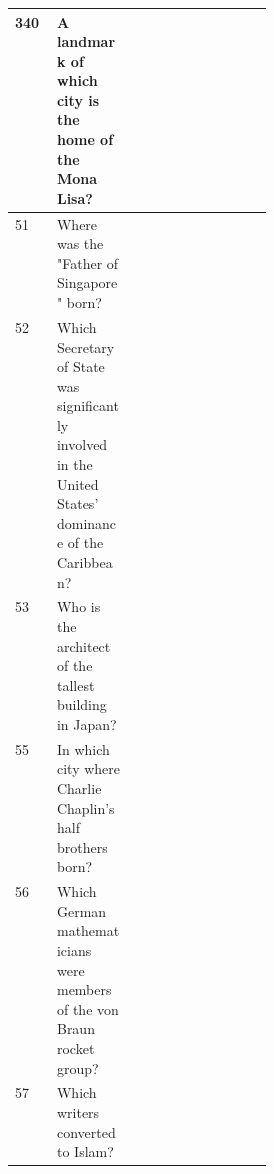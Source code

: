 \begin{longtable}{@{}lp{0.3\linewidth}lllllllll@{}}
340      & A landmark of which city is the home of the Mona Lisa?                                                      & \cellcolor[HTML]{FE0000}   & \cellcolor[HTML]{FE0000}    & \cellcolor[HTML]{FE0000}    & \cellcolor[HTML]{FE0000} & \cellcolor[HTML]{FE0000} & \cellcolor[HTML]{FE0000} & \cellcolor[HTML]{FE0000} & \cellcolor[HTML]{FE0000} & \cellcolor[HTML]{FE0000} \\
\hline
51       & Where was the "Father of Singapore" born?                                                                   & \cellcolor[HTML]{BBDAFF}    & \cellcolor[HTML]{BBDAFF}     & \cellcolor[HTML]{BBDAFF}     & \cellcolor[HTML]{BBDAFF}  & \cellcolor[HTML]{BBDAFF}  & \cellcolor[HTML]{BBDAFF}  & \cellcolor[HTML]{BBDAFF} & \cellcolor[HTML]{BBDAFF} & \cellcolor[HTML]{BBDAFF} \\
52       & Which Secretary of State was significantly involved in the United States' dominance of the Caribbean?       & \cellcolor[HTML]{FE0000}   & \cellcolor[HTML]{FE0000}    & \cellcolor[HTML]{FE0000}    & \cellcolor[HTML]{FE0000} & \cellcolor[HTML]{FE0000} & \cellcolor[HTML]{FE0000} & \cellcolor[HTML]{FE0000} & \cellcolor[HTML]{FE0000} & \cellcolor[HTML]{FE0000} \\
53       & Who is the architect of the tallest building in Japan?                                                      & \cellcolor[HTML]{BBDAFF}    & \cellcolor[HTML]{BBDAFF}     & \cellcolor[HTML]{BBDAFF}     & \cellcolor[HTML]{BBDAFF}  & \cellcolor[HTML]{BBDAFF}  & \cellcolor[HTML]{BBDAFF}  & \cellcolor[HTML]{BBDAFF} & \cellcolor[HTML]{BBDAFF} & \cellcolor[HTML]{BBDAFF} \\
55       & In which city where Charlie Chaplin's half brothers born?                                                   & \cellcolor[HTML]{BBDAFF}    & \cellcolor[HTML]{BBDAFF}     & \cellcolor[HTML]{BBDAFF}     & \cellcolor[HTML]{BBDAFF}  & \cellcolor[HTML]{BBDAFF}  & \cellcolor[HTML]{BBDAFF}  & \cellcolor[HTML]{BBDAFF} & \cellcolor[HTML]{BBDAFF} & \cellcolor[HTML]{BBDAFF} \\
56       & Which German mathematicians were members of the von Braun rocket group?                                     & \cellcolor[HTML]{FE0000}   & \cellcolor[HTML]{FE0000}    & \cellcolor[HTML]{FE0000}    & \cellcolor[HTML]{FE0000} & \cellcolor[HTML]{FE0000} & \cellcolor[HTML]{FE0000} & \cellcolor[HTML]{FE0000} & \cellcolor[HTML]{FE0000} & \cellcolor[HTML]{FE0000} \\
57       & Which writers converted to Islam?                                                                           & \cellcolor[HTML]{BBDAFF}    & \cellcolor[HTML]{BBDAFF}     & \cellcolor[HTML]{BBDAFF}     & \cellcolor[HTML]{BBDAFF}  & \cellcolor[HTML]{BBDAFF}  & \cellcolor[HTML]{BBDAFF}  & \cellcolor[HTML]{BBDAFF} & \cellcolor[HTML]{BBDAFF} & \cellcolor[HTML]{BBDAFF} \\

\end{longtable}
